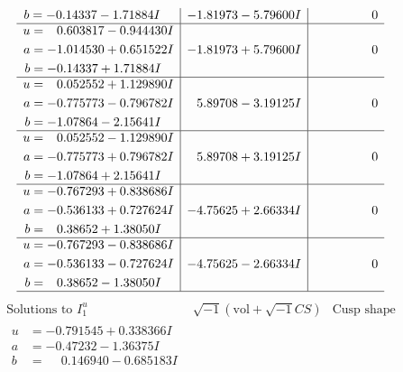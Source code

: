 \documentclass[1p]{elsarticle_modified}
\theoremstyle{definition}
\newcommand{\I}{\sqrt{-1}}
\begin{document}
$$\begin{array}{c|c|c}
\begin{aligned}
b &= -0.14337 - 1.71884 I\end{aligned}
 & -1.81973 - 5.79600 I & \phantom{-0.000000 } 0 \\ \hline\begin{aligned}
u &= \phantom{-}0.603817 - 0.944430 I \\
a &= -1.014530 + 0.651522 I \\
b &= -0.14337 + 1.71884 I\end{aligned}
 & -1.81973 + 5.79600 I & \phantom{-0.000000 } 0 \\ \hline\begin{aligned}
u &= \phantom{-}0.052552 + 1.129890 I \\
a &= -0.775773 - 0.796782 I \\
b &= -1.07864 - 2.15641 I\end{aligned}
 & \phantom{-}5.89708 - 3.19125 I & \phantom{-0.000000 } 0 \\ \hline\begin{aligned}
u &= \phantom{-}0.052552 - 1.129890 I \\
a &= -0.775773 + 0.796782 I \\
b &= -1.07864 + 2.15641 I\end{aligned}
 & \phantom{-}5.89708 + 3.19125 I & \phantom{-0.000000 } 0 \\ \hline\begin{aligned}
u &= -0.767293 + 0.838686 I \\
a &= -0.536133 + 0.727624 I \\
b &= \phantom{-}0.38652 + 1.38050 I\end{aligned}
 & -4.75625 + 2.66334 I & \phantom{-0.000000 } 0 \\ \hline\begin{aligned}
u &= -0.767293 - 0.838686 I \\
a &= -0.536133 - 0.727624 I \\
b &= \phantom{-}0.38652 - 1.38050 I\end{aligned}
 & -4.75625 - 2.66334 I & \phantom{-0.000000 } 0\\
 \hline 
 \end{array}$$\newpage$$\begin{array}{c|c|c}  
\text{Solutions to }I^u_{1}& \I (\text{vol} + \sqrt{-1}CS) & \text{Cusp shape}\\
 \hline 
\begin{aligned}
u &= -0.791545 + 0.338366 I \\
a &= -0.47232 - 1.36375 I \\
b &= \phantom{-}0.146940 - 0.685183 I\end{aligned}

\end{array}$$
\end{document}
